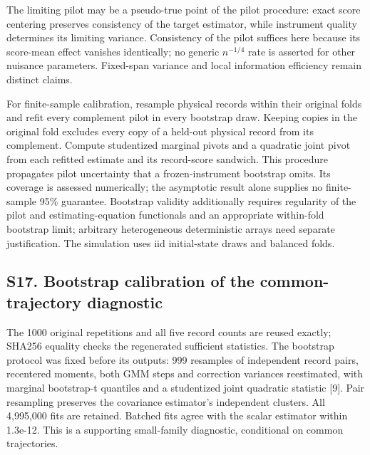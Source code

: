 \documentclass[
  american,
  11pt,
]{article}
\begin{document}
The limiting pilot may be a pseudo-true point of the pilot procedure:
exact score centering preserves consistency of the target estimator,
while instrument quality determines its limiting variance. Consistency
of the pilot suffices here because its score-mean effect vanishes
identically; no generic \(n^{-1/4}\) rate is asserted for other nuisance
parameters. Fixed-span variance and local information efficiency remain
distinct claims.

For finite-sample calibration, resample physical records within their
original folds and refit every complement pilot in every bootstrap draw.
Keeping copies in the original fold excludes every copy of a held-out
physical record from its complement. Compute studentized marginal pivots
and a quadratic joint pivot from each refitted estimate and its
record-score sandwich. This procedure propagates pilot uncertainty that
a frozen-instrument bootstrap omits. Its coverage is assessed
numerically; the asymptotic result alone supplies no finite-sample 95\%
guarantee. Bootstrap validity additionally requires regularity of the
pilot and estimating-equation functionals and an appropriate within-fold
bootstrap limit; arbitrary heterogeneous deterministic arrays need
separate justification. The simulation uses iid initial-state draws and
balanced folds.

\subsection{S17. Bootstrap calibration of the common-trajectory
diagnostic}\label{s17.-bootstrap-calibration-of-the-common-trajectory-diagnostic}

The 1000 original repetitions and all five record counts are reused
exactly; SHA256 equality checks the regenerated sufficient statistics.
The bootstrap protocol was fixed before its outputs: 999 resamples of
independent record pairs, recentered moments, both GMM steps and
correction variances reestimated, with marginal bootstrap-t quantiles
and a studentized joint quadratic statistic {[}9{]}. Pair resampling
preserves the covariance estimator's independent clusters. All 4,995,000
fits are retained. Batched fits agree with the scalar estimator within
1.3e-12. This is a supporting small-family diagnostic, conditional on
common trajectories.
\end{document}
